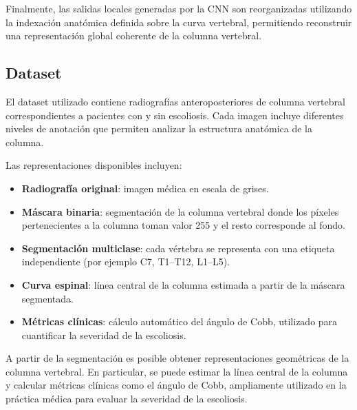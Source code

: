 \documentclass[conference]{IEEEtran}
\begin{document}
Finalmente, las salidas locales generadas por la CNN son reorganizadas utilizando la indexación anatómica definida sobre la curva vertebral, permitiendo reconstruir una representación global coherente de la columna vertebral.



\subsection{Dataset}

El dataset utilizado contiene radiografías anteroposteriores de columna vertebral
correspondientes a pacientes con y sin escoliosis. Cada imagen incluye diferentes
niveles de anotación que permiten analizar la estructura anatómica de la columna.

Las representaciones disponibles incluyen:

\begin{itemize}

\item \textbf{Radiografía original}: imagen médica en escala de grises.

\item \textbf{Máscara binaria}: segmentación de la columna vertebral donde los
píxeles pertenecientes a la columna toman valor 255 y el resto corresponde al fondo.

\item \textbf{Segmentación multiclase}: cada vértebra se representa con una etiqueta
independiente (por ejemplo C7, T1--T12, L1--L5).

\item \textbf{Curva espinal}: línea central de la columna estimada a partir de la
máscara segmentada.

\item \textbf{Métricas clínicas}: cálculo automático del ángulo de Cobb,
utilizado para cuantificar la severidad de la escoliosis.

\end{itemize}





A partir de la segmentación es posible obtener representaciones geométricas
de la columna vertebral. En particular, se puede estimar la línea central
de la columna y calcular métricas clínicas como el ángulo de Cobb, ampliamente
utilizado en la práctica médica para evaluar la severidad de la escoliosis.
\end{document}
